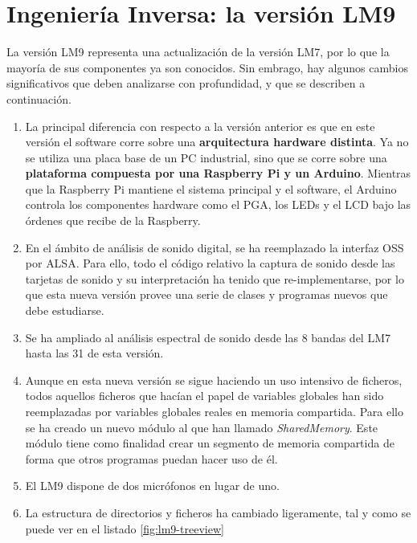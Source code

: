 \chapter{Ingeniería Inversa: la versión \acrshort{LM9}} \label{cap:capitulo3_III}

La versión \acrshort{LM9} representa una actualización de la versión \acrshort{LM7}, por lo que la mayoría de sus componentes ya son conocidos. Sin embrago, hay algunos cambios significativos que deben analizarse con profundidad, y que se describen a continuación.

\begin{enumerate}
	\item La principal diferencia con respecto a la versión anterior es que en este versión el software corre sobre una \textbf{arquitectura hardware distinta}. Ya no se utiliza una placa base de un PC industrial, sino que se corre sobre una \textbf{plataforma compuesta por una Raspberry Pi y un Arduino}. Mientras que la Raspberry Pi mantiene el sistema principal y el software, el Arduino controla los componentes hardware como el \acrshort{PGA}, los \acrshort{LED}s y el \acrshort{LCD} bajo las órdenes que recibe de la Raspberry.

	\item En el ámbito de análisis de sonido digital, se ha reemplazado la interfaz \acrfull{OSS} por \acrfull{ALSA}. Para ello, todo el código relativo la captura de sonido desde las tarjetas de sonido y su interpretación ha tenido que re-implementarse, por lo que esta nueva versión provee una serie de clases y programas nuevos que debe estudiarse.

	\item Se ha ampliado al análisis espectral de sonido desde las 8 bandas del \acrshort{LM7} hasta las 31 de esta versión.

	\item Aunque en esta nueva versión se sigue haciendo un uso intensivo de ficheros, todos aquellos ficheros que hacían el papel de variables globales han sido reemplazadas por variables globales reales en memoria compartida. Para ello se ha creado un nuevo módulo al que han llamado \textit{SharedMemory}. Este módulo tiene como finalidad crear un segmento de memoria compartida de forma que otros programas puedan hacer uso de él.

	\item El \acrshort{LM9} dispone de dos micrófonos en lugar de uno.

	\item La estructura de directorios y ficheros ha cambiado ligeramente, tal y como se puede ver en el listado \ref{fig:lm9-treeview}
\end{enumerate}

